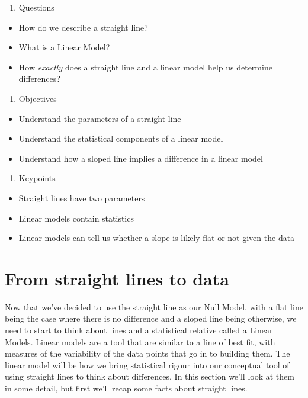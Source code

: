 \documentclass[
]{book}
\providecommand{\tightlist}{%
  \setlength{\itemsep}{0pt}\setlength{\parskip}{0pt}}
\begin{document}
\begin{enumerate}
\def\labelenumi{\arabic{enumi}.}
\tightlist
\item
  Questions
\end{enumerate}

\begin{itemize}
\tightlist
\item
  How do we describe a straight line?
\item
  What is a Linear Model?
\item
  How \emph{exactly} does a straight line and a linear model help us determine differences?
\end{itemize}

\begin{enumerate}
\def\labelenumi{\arabic{enumi}.}
\setcounter{enumi}{1}
\tightlist
\item
  Objectives
\end{enumerate}

\begin{itemize}
\tightlist
\item
  Understand the parameters of a straight line
\item
  Understand the statistical components of a linear model
\item
  Understand how a sloped line implies a difference in a linear model
\end{itemize}

\begin{enumerate}
\def\labelenumi{\arabic{enumi}.}
\setcounter{enumi}{2}
\tightlist
\item
  Keypoints
\end{enumerate}

\begin{itemize}
\tightlist
\item
  Straight lines have two parameters
\item
  Linear models contain statistics
\item
  Linear models can tell us whether a slope is likely flat or not given the data
\end{itemize}

\hypertarget{from-straight-lines-to-data}{%
\section{From straight lines to data}\label{from-straight-lines-to-data}}

Now that we've decided to use the straight line as our Null Model, with a flat line being the case where there is no difference and a sloped line being otherwise, we need to start to think about lines and a statistical relative called a Linear Models. Linear models are a tool that are similar to a line of best fit, with measures of the variability of the data points that go in to building them. The linear model will be how we bring statistical rigour into our conceptual tool of using straight lines to think about differences. In this section we'll look at them in some detail, but first we'll recap some facts about straight lines.
\end{document}
